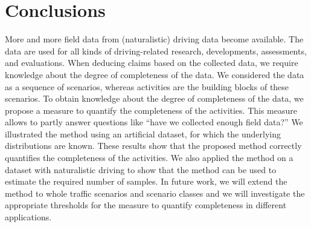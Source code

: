\section{Conclusions}
\label{sec:conclusion}

More and more field data from (naturalistic) driving data become available. The data are used for all kinds of driving-related research, developments, assessments, and evaluations. When deducing claims based on the collected data, we require knowledge about the degree of completeness of the data. 
We considered the data as a sequence of scenarios, whereas activities are the building blocks of these scenarios. To obtain knowledge about the degree of completeness of the data, we propose a measure to quantify the completeness of the activities. This measure allows to partly answer questions like ``have we collected enough field data?'' 
We illustrated the method using an artificial dataset, for which the underlying distributions are known. These results show that the proposed method correctly quantifies the completeness of the activities. We also applied the method on a dataset with naturalistic driving to show that the method can be used to estimate the required number of samples.
In future work, we will extend the method to whole traffic scenarios and scenario classes \cstart and we will investigate the appropriate thresholds for the measure to quantify completeness in different applications. \cend
